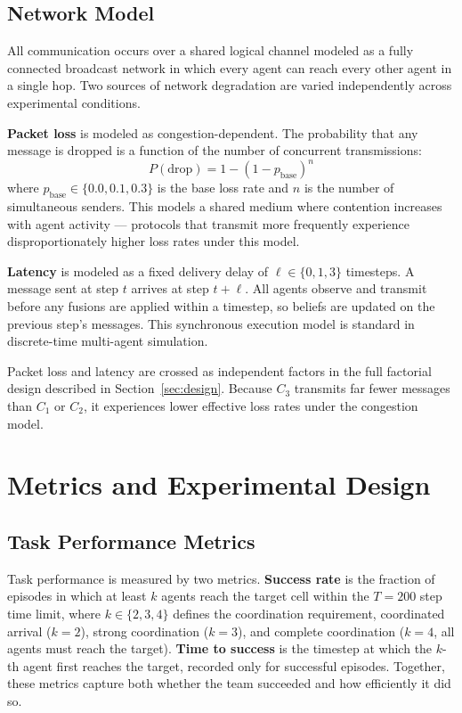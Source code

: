 \documentclass[pdflatex,sn-mathphys-num]{sn-jnl}%
\theoremstyle{thmstyleone}%
\theoremstyle{thmstyletwo}%
\theoremstyle{thmstylethree}%
\begin{document}
\subsection{Network Model}
\label{sec:network}

All communication occurs over a shared logical channel modeled as a 
fully connected broadcast network in which every agent can reach every 
other agent in a single hop. Two sources of network degradation are 
varied independently across experimental conditions.

\textbf{Packet loss} is modeled as congestion-dependent. The probability 
that any message is dropped is a function of the number of concurrent 
transmissions:
\begin{equation}
    P(\text{drop}) = 1 - (1 - p_{\text{base}})^{n}
\end{equation}
where $p_{\text{base}} \in \{0.0, 0.1, 0.3\}$ is the base loss rate 
and $n$ is the number of simultaneous senders. This models a shared 
medium where contention increases with agent activity --- protocols 
that transmit more frequently experience disproportionately higher 
loss rates under this model.

\textbf{Latency} is modeled as a fixed delivery delay of 
$\ell \in \{0, 1, 3\}$ timesteps. A message sent at step $t$ arrives 
at step $t + \ell$. All agents observe and transmit before any fusions are 
applied within a timestep, so beliefs are updated on the previous 
step's messages. This synchronous execution model is standard in 
discrete-time multi-agent simulation.

Packet loss and latency are crossed as independent factors in the 
full factorial design described in Section~\ref{sec:design}. Because 
$C_3$ transmits far fewer messages than $C_1$ or $C_2$, it experiences lower 
effective loss rates under the congestion model.

\section{Metrics and Experimental Design}
\label{sec:metrics}

\subsection{Task Performance Metrics}

Task performance is measured by two metrics. \textbf{Success rate} is
the fraction of episodes in which at least $k$ agents reach the target
cell within the $T = 200$ step time limit, where $k \in \{2, 3, 4\}$
defines the coordination requirement, coordinated arrival ($k=2$), strong coordination
($k=3$), and complete coordination ($k = 4$, all agents must reach the target). \textbf{Time to success} is
the timestep at which the $k$-th agent first reaches the target,
recorded only for successful episodes. Together, these metrics capture
both whether the team succeeded and how efficiently it did so.
\end{document}
